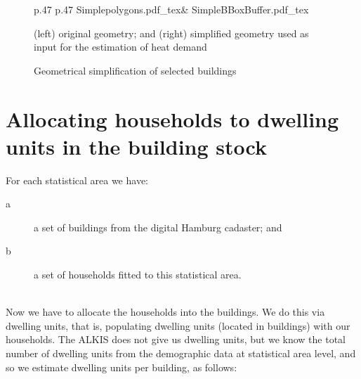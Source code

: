 \documentclass[11pt]{IJM-article}
\begin{document}
\begin{figure}[htb]
    \centering 
    \caption{Geometrical simplification of selected buildings}\label{fig:5} 
    \vspace{1em}
    \begin{tabular}{p{.47\textwidth} p{.47\textwidth}} 
        \def\svgwidth{\linewidth}
        {Simplepolygons.pdf_tex}& 
        \def\svgwidth{\linewidth}
        {SimpleBBoxBuffer.pdf_tex} 
    \end{tabular} 
    \begin{flushleft}
    \begin{footnotesize}
    (left) original geometry; and (right) simplified geometry used as input for
    the estimation of heat demand
    \end{footnotesize}
    \end{flushleft}
\end{figure}

\section{Allocating households to dwelling units in the building stock}
\label{sec:7}

For each statistical area we have:\\
\begin{description}
    \item[a] a set of buildings from the digital Hamburg cadaster; and
    \item[b] a set of households fitted to this statistical area.
\end{description}\\

Now we have to allocate the households into the buildings. We do this via
dwelling units, that is, populating dwelling units (located in buildings) with
our households. The ALKIS does not give us dwelling units, but we know the
total number of dwelling units from the demographic data at statistical area
level, and so we estimate dwelling units per building, as follows:\\
\end{document}
